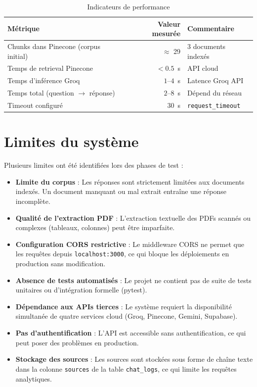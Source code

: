 \documentclass[12pt, a4paper, twoside]{report}
\begin{document}
\begin{table}[H]
\centering
\caption{Indicateurs de performance}
\label{tab:perfs}
\begin{tabular}{l r l}
\toprule
\textbf{Métrique} & \textbf{Valeur mesurée} & \textbf{Commentaire} \\
\midrule
Chunks dans Pinecone (corpus initial) & $\approx$ 29 & 3 documents indexés \\
Temps de retrieval Pinecone             & $< 0.5$~s   & API cloud \\
Temps d'inférence Groq                  & $1$--$4$~s  & Latence Groq API \\
Temps total (question $\to$ réponse)    & $2$--$8$~s  & Dépend du réseau \\
Timeout configuré                       & $30$~s      & \texttt{request\_timeout} \\
\bottomrule
\end{tabular}
\end{table}

\section{Limites du système}

Plusieurs limites ont été identifiées lors des phases de test :

\begin{itemize}
  \item \textbf{Limite du corpus} : Les réponses sont strictement limitées aux documents indexés. Un document manquant ou mal extrait entraîne une réponse incomplète.
  \item \textbf{Qualité de l'extraction PDF} : L'extraction textuelle des PDFs scannés ou complexes (tableaux, colonnes) peut être imparfaite.
  \item \textbf{Configuration CORS restrictive} : Le middleware CORS ne permet que les requêtes depuis \texttt{localhost:3000}, ce qui bloque les déploiements en production sans modification.
  \item \textbf{Absence de tests automatisés} : Le projet ne contient pas de suite de tests unitaires ou d'intégration formelle (pytest).
  \item \textbf{Dépendance aux APIs tierces} : Le système requiert la disponibilité simultanée de quatre services cloud (Groq, Pinecone, Gemini, Supabase).
  \item \textbf{Pas d'authentification} : L'API est accessible sans authentification, ce qui peut poser des problèmes en production.
  \item \textbf{Stockage des sources} : Les sources sont stockées sous forme de chaîne texte dans la colonne \texttt{sources} de la table \texttt{chat\_logs}, ce qui limite les requêtes analytiques.
\end{itemize}
\end{document}
